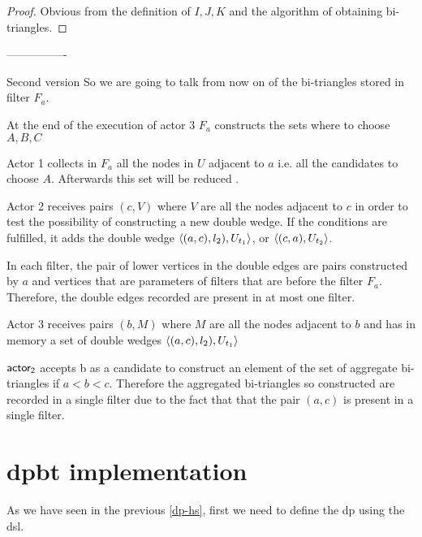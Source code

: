 \begin{proof}

Obvious from the definition of $I,J,K$  and the algorithm of obtaining bi-triangles. 
\iffalse
Lets assume that a bi-triangle $(a,A,b,B,c,C)$   will assume that $a$ is the smallest element in the set $\{a,b,c\}$ and $c$ is the bigger.
When actor 1 in fiter $F_a$1 ends reading all the edges, $\{A,B\} \subseteq W_a$. Also When actor 1 in fiter $F_c$1 ends reading all the edges, $\{B,C\} \subseteq W_c$. 

AS $a < c$  in filter $F_a$ the pair $(a,c)$  will be added to D
$DW$. When actor 3 in filter $F_a$ receives $(b, W_b)$ will add to $BT$ because of the non empty intersection. Therefore the bi-triangle $(a,A,b,B,c,C)$ can be recognized
\fi
\end{proof}

----------------

Second version
 So we are going to talk from now on of the bi-triangles stored in  filter $F_a$.

 At the end of the execution of actor 3 $F_a$ constructs the sets where to choose $A,B,C$
 
 Actor 1 collects in $F_a$ all the nodes in $U$ adjacent to $a$ i.e. all the candidates to choose $A$. Afterwards this set will be reduced . 
 
 Actor 2 receives pairs $(c,V)$ where $V$ are all the nodes adjacent to $c$ in order to test the possibility of constructing a new double wedge.  If the conditions are fulfilled, it adds the double wedge $\left\langle (a,c), l_2), U_{t_1} \right\rangle$,  or $\left\langle (c, a), U_{t_2} \right\rangle$. 
 
 In each filter, the pair of lower vertices in the double edges are pairs constructed by $a$ and vertices that are parameters of filters that are before the filter $F_a$. Therefore, the double edges recorded are present in at most one filter.
 
 Actor 3 receives pairs $(b,M) $ where $M$ are all the nodes adjacent to $b$ and has in memory a set of double wedges $\left\langle (a,c), l_2), U_{t_1} \right\rangle$
 
 $\mathsf{actor_2}$ accepts b as a candidate to construct an element of the set of aggregate bi-triangles if $a < b < c$. Therefore the aggregated bi-triangles so constructed are recorded in a single filter due to the fact that that the pair $(a,c)$ is present in a single filter.
 
 
\section{\acrshort{dpbt} implementation}
As we have seen in the previous \autoref{dp-hs}, first we need to define the \acrshort{dp} using the \acrshort{dsl}.

